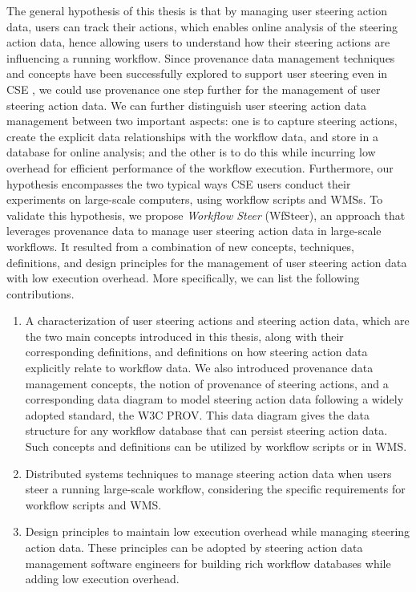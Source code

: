 The general hypothesis of this thesis is that by 
managing user steering action data,
users can track their actions, which enables online analysis of the steering action data, hence allowing users to understand how their steering actions are influencing a running workflow. 
Since provenance data management techniques and concepts have been successfully explored to support user steering even in CSE \cite{Silva2017Raw, Silva2018Capturing, souza_keeping_2019}, we could use provenance
one step further
for the management of user steering action data. 
We can further distinguish user steering action data management between two important aspects: one is to capture steering actions, create the explicit data relationships with the workflow data, and store in a database for online analysis; and the other is to do this while incurring low overhead for efficient performance of the workflow execution. Furthermore, our hypothesis encompasses the two typical ways CSE users conduct their experiments
on large-scale computers, \ie{} using workflow scripts and WMSs. 
To validate this hypothesis, we propose 
\textit{Workflow Steer} (WfSteer), an approach that leverages provenance data to manage user steering action data in large-scale workflows.
It resulted from a combination of new concepts, techniques, definitions, and design principles for the management of user steering action data with low execution overhead. More specifically, we can list the following contributions.

\begin{enumerate}[label=(\Roman*),itemsep=0pt]

    \item 
    A characterization of user steering actions and steering action data, which are the two main concepts introduced in this thesis, along with their corresponding definitions, and definitions on how steering action data explicitly relate to workflow data.
    We also introduced provenance data management concepts, the notion of provenance of steering actions, and a corresponding data diagram to model steering action data following a widely adopted standard, the W3C PROV. This data diagram gives the data structure for any workflow database that can persist steering action data. Such concepts and definitions can be utilized by workflow scripts or in WMS.

    \item
    Distributed systems techniques to manage steering action data when users steer a running large-scale workflow, considering the specific requirements for workflow scripts and WMS.

    \item Design principles to maintain low execution overhead while managing steering action data.
    These principles can be adopted by steering action data management software engineers for building rich workflow databases while adding low execution overhead.

\end{enumerate}


